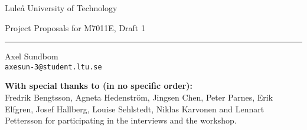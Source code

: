 \centering

{\Huge Luleå University of Technology}\par
\vspace{1ex}
{\Large Project Proposals for M7011E, Draft 1}\par
\rule{.5\textwidth}{.4pt}



\vspace{4ex}
\begin{minipage}{.3\textwidth}
\centering
Axel Sundbom\\
\texttt{axesun-3@student.ltu.se}
\end{minipage}

\vfill
\begin{abstract}
\noindent This document describes some programming project assignments for the course M7011E that came out of a fifth year project for computer engineering students. Most of these assignments are results of interviews with examiners and suggestions from a workshop that was held as a part of the pre-study. You may redistribute this document under the terms and agreements of the MIT license.
\end{abstract}

\tableofcontents
\vfill
\textbf{With special thanks to (in no specific order):}\\
Fredrik Bengtsson, Agneta Hedenström, Jingsen Chen, Peter Parnes, Erik Elfgren, Josef Hallberg, Louise Sehlstedt, Niklas Karvonen and Lennart Pettersson for participating in the interviews and the workshop.


